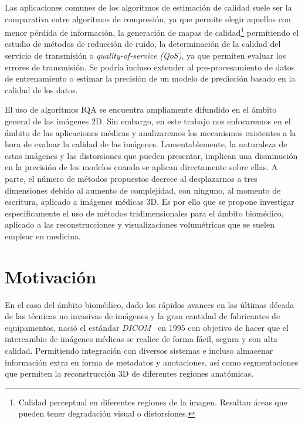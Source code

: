 Las aplicaciones comunes de los algoritmos de estimación de calidad suele ser 
la comparativa entre algoritmos de compresión, ya que permite elegir aquellos con 
menor pérdida de información, la generación de mapas de calidad\footnote{
  Calidad perceptual en diferentes regiones de la imagen. Resaltan áreas que 
  pueden tener degradación visual o distorsiones.
}
permitiendo el estudio de métodos de reducción de ruido,
la determinación de la calidad del servicio de transmisión o \emph{quality-of-service (QoS)},
ya que permiten evaluar los errores de transmisión\cite{VMAF, VMAFReproducibility}. Se podría incluso 
extender al pre-procesamiento de datos de entrenamiento o estimar la precisión 
de un modelo de predicción basado en la calidad de los datos\cite{ApplicationsOfIQA}.

El uso de algoritmos IQA se encuentra ampliamente difundido en el ámbito general de las imágenes 2D. Sin embargo, en este trabajo nos enfocaremos en el ámbito de las aplicaciones médicas y analizaremos los mecanismos existentes a la hora de evaluar la calidad de las imágenes. 
Lamentablemente, la naturaleza de estas imágenes y las distorsiones que 
pueden presentar, implican una disminución en la precisión de los modelos 
cuando se aplican directamente sobre ellas\cite{VisualMedicalQualityBook}.
A parte, el número de métodos propuestos decrece al desplazarnos a tres dimensiones 
debido al aumento de complejidad, con ninguno, al momento de escritura, 
aplicado a imágenes médicas 3D.
Es por ello que se propone investigar específicamente el uso de métodos tridimensionales para 
el ámbito biomédico, aplicado a las reconstrucciones y visualizaciones volumétricas 
que se suelen emplear en medicina.



\section{Motivación}
 
En el caso del ámbito biomédico, dado los rápidos avances en las últimas década
de las técnicas no invasivas de imágenes y la gran cantidad de fabricantes 
de equipamentos, nació el estándar \emph{DICOM}~\cite{Parisot1995} en 1995 
con objetivo de hacer que el intercambio de imágenes médicas se realice de forma 
fácil, segura y con alta calidad. Permitiendo integración con diversos sistemas e 
incluso almacenar información extra en forma de metadatos y anotaciones, así como segmentaciones que permiten la reconstrucción 3D de diferentes regiones anatómicas.


